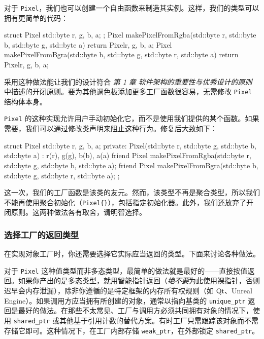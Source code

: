 对于 \texttt{Pixel}，我们也可以创建一个自由函数来制造其实例。这样，我们的类型可以拥有更简单的代码：

\begin{codebox}[cpp]
struct Pixel {
    std::byte r, g, b, a;
};
Pixel makePixelFromRgba(std::byte r, std::byte b, std::byte g, std::byte a) {
    return Pixel{r, g, b, a};
}
Pixel makePixelFromBgra(std::byte b, std::byte g, std::byte r, std::byte a) {
    return Pixel{r, g, b, a};
}
\end{codebox}

采用这种做法能让我们的设计符合 \emph{第 1 章} \emph{软件架构的重要性与优秀设计的原则} 中描述的开闭原则。要为其他调色板添加更多工厂函数很容易，无需修改 \texttt{Pixel} 结构体本身。

\label{idx:574}
\texttt{Pixel} 的这种实现允许用户手动初始化它，而不是使用我们提供的某个函数。如果需要，我们可以通过修改类声明来阻止这种行为。修复后大致如下：

\begin{codebox}[cpp]
struct Pixel {
    std::byte r, g, b, a;
private:
    Pixel(std::byte r, std::byte g, std::byte b, std::byte a)
        : r(r), g(g), b(b), a(a) {}
    friend Pixel makePixelFromRgba(std::byte r, std::byte g, std::byte b, std::byte a);
    friend Pixel makePixelFromBgra(std::byte b, std::byte g, std::byte r, std::byte a);
};
\end{codebox}

这一次，我们的工厂函数是该类的友元。然而，该类型不再是聚合类型，所以我们不能再使用聚合初始化（\texttt{Pixel\{\}}），包括指定初始化器。此外，我们还放弃了开闭原则。这两种做法各有取舍，请明智选择。

\subsubsection{选择工厂的返回类型}

\label{idx:575}
在实现对象工厂时，你还需要选择它实际应当返回的类型。下面来讨论各种做法。

对于 \texttt{Pixel} 这种值类型而非多态类型，最简单的做法就是最好的——直接按值返回。如果你产出的是多态类型，就用智能指针返回（\emph{绝不要}为此使用裸指针，否则迟早会内存泄漏），除非你遵循的是特定框架的内存所有权规则（如 Qt、Unreal Engine）。如果调用方应当拥有所创建的对象，通常以指向基类的 \texttt{unique\_\allowbreak{}ptr} 返回是最好的做法。在那些不太常见、工厂与调用方必须共同拥有对象的情况下，使用 \texttt{shared\_\allowbreak{}ptr} 或其他基于引用计数的替代方案。有时工厂只需跟踪该对象而不需存储它即可。这种情况下，在工厂内部存储 \texttt{weak\_ptr}，在外部锁定 \texttt{shared\_\allowbreak{}ptr}。

